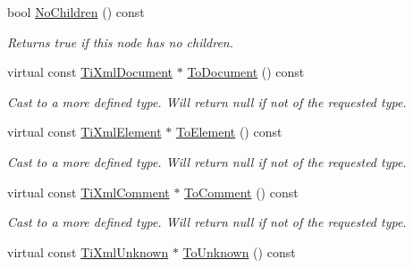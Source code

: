 \begin{DoxyCompactItemize}
\item 
\hypertarget{class_ti_xml_node_aeed21ad30630ef6e7faf096127edc9f3}{
bool \hyperlink{class_ti_xml_node_aeed21ad30630ef6e7faf096127edc9f3}{NoChildren} () const }
\label{class_ti_xml_node_aeed21ad30630ef6e7faf096127edc9f3}

\begin{DoxyCompactList}\small\item\em Returns true if this node has no children. \item\end{DoxyCompactList}\item 
\hypertarget{class_ti_xml_node_a8a4cda4b15c29f64cff419309aebed08}{
virtual const \hyperlink{class_ti_xml_document}{TiXmlDocument} $\ast$ \hyperlink{class_ti_xml_node_a8a4cda4b15c29f64cff419309aebed08}{ToDocument} () const }
\label{class_ti_xml_node_a8a4cda4b15c29f64cff419309aebed08}

\begin{DoxyCompactList}\small\item\em Cast to a more defined type. Will return null if not of the requested type. \item\end{DoxyCompactList}\item 
\hypertarget{class_ti_xml_node_a72abed96dc9667ab9e0a2a275301bb1c}{
virtual const \hyperlink{class_ti_xml_element}{TiXmlElement} $\ast$ \hyperlink{class_ti_xml_node_a72abed96dc9667ab9e0a2a275301bb1c}{ToElement} () const }
\label{class_ti_xml_node_a72abed96dc9667ab9e0a2a275301bb1c}

\begin{DoxyCompactList}\small\item\em Cast to a more defined type. Will return null if not of the requested type. \item\end{DoxyCompactList}\item 
\hypertarget{class_ti_xml_node_aa0a5086f9eaee910bbfdc7f975e26574}{
virtual const \hyperlink{class_ti_xml_comment}{TiXmlComment} $\ast$ \hyperlink{class_ti_xml_node_aa0a5086f9eaee910bbfdc7f975e26574}{ToComment} () const }
\label{class_ti_xml_node_aa0a5086f9eaee910bbfdc7f975e26574}

\begin{DoxyCompactList}\small\item\em Cast to a more defined type. Will return null if not of the requested type. \item\end{DoxyCompactList}\item 
\hypertarget{class_ti_xml_node_afd7205cf31d7a376929f8a36930627a2}{
virtual const \hyperlink{class_ti_xml_unknown}{TiXmlUnknown} $\ast$ \hyperlink{class_ti_xml_node_afd7205cf31d7a376929f8a36930627a2}{ToUnknown} () const }
\label{class_ti_xml_node_afd7205cf31d7a376929f8a36930627a2}


\end{DoxyCompactItemize}
